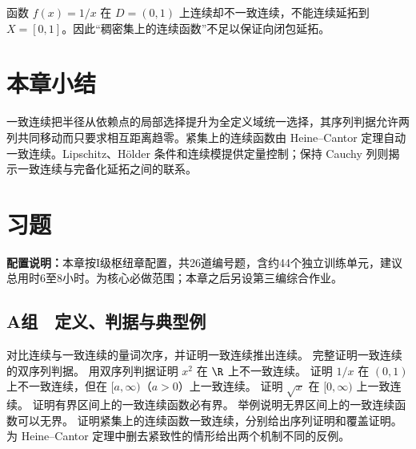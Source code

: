 \begin{counterexample}
函数 \(f(x)=1/x\) 在 \(D=(0,1)\) 上连续却不一致连续，不能连续延拓到 \(X=[0,1]\)。因此“稠密集上的连续函数”不足以保证向闭包延拓。
\end{counterexample}

\section*{本章小结}

一致连续把半径从依赖点的局部选择提升为全定义域统一选择，其序列判据允许两列共同移动而只要求相互距离趋零。紧集上的连续函数由 Heine--Cantor 定理自动一致连续。Lipschitz、Hölder 条件和连续模提供定量控制；保持 Cauchy 列则揭示一致连续与完备化延拓之间的联系。

\section*{习题}

\noindent\textbf{配置说明：}本章按I级枢纽章配置，共26道编号题，含约44个独立训练单元，建议总用时6至8小时。为核心必做范围；本章之后另设第三编综合作业。

\subsection*{A组　定义、判据与典型例}
\begin{enumerate}[label=\textbf{19.\arabic*.}]
  \mustdo 对比连续与一致连续的量词次序，并证明一致连续推出连续。
  \mustdo 完整证明一致连续的双序列判据。
  \mustdo 用双序列判据证明 \(x^2\) 在 \(\R\) 上不一致连续。
  \mustdo 证明 \(1/x\) 在 \((0,1)\) 上不一致连续，但在 \([a,\infty)\)（\(a>0\)）上一致连续。
  \mustdo 证明 \(\sqrt x\) 在 \([0,\infty)\) 上一致连续。
  \mustdo 证明有界区间上的一致连续函数必有界。
  \mustdo 举例说明无界区间上的一致连续函数可以无界。
  \mustdo 证明紧集上的连续函数一致连续，分别给出序列证明和覆盖证明。
  \mustdo 为 Heine--Cantor 定理中删去紧致性的情形给出两个机制不同的反例。
\end{enumerate}

